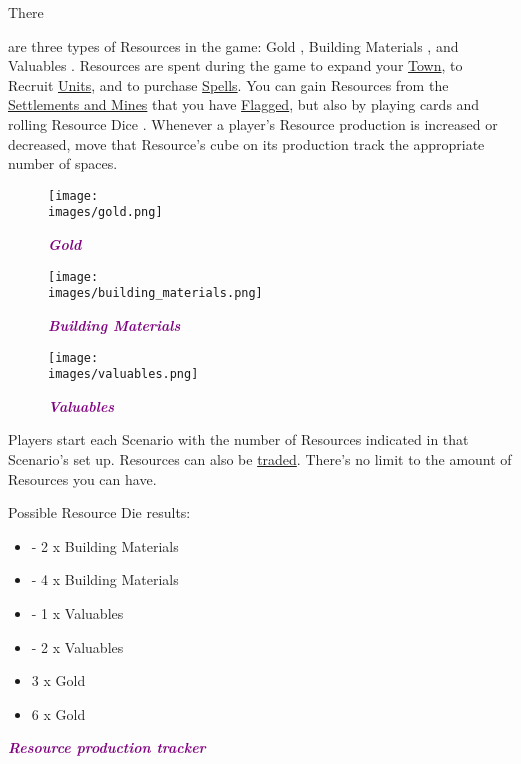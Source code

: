 \hypertarget{Resources}{There} are three types of Resources in the game: Gold , Building Materials , and Valuables .
Resources are spent during the game to expand your \hyperlink{Town}{Town}, to Recruit \hyperlink{Units}{Units}, and to purchase \hyperlink{spells}{Spells}.
You can gain Resources from the \hyperlink{Mines}{Settlements and Mines} that you have \hyperlink{Categories}{Flagged}, but also by playing cards and rolling Resource Dice .
Whenever a player's Resource production is increased or decreased, move that Resource's cube on its production track the appropriate number of spaces.\par
\begin{figure}[h]
  \centering
    \centering
    \texttt{[image: \\images/gold.png]}
    \caption{{\textit{\textbf{\textcolor{purple}{Gold}}}}}
  \endminipage
    \centering
    \texttt{[image: \\images/building\_materials.png]}
    \caption{{\textit{\textbf{{\textcolor{purple}{Building Materials}}}}}}
  \endminipage
    \centering
    \texttt{[image: \\images/valuables.png]}
    \caption{{\textit{\textbf{{\textcolor{purple}{Valuables}}}}}}
  \endminipage
\end{figure}
Players start each Scenario with the number of Resources indicated in that Scenario’s set up.
Resources can also be \hyperlink{Trading}{traded}.
There's no limit to the amount of Resources you can have.\bigbreak

\begin{minipage}[T]{0.38\textwidth}
    Possible Resource Die  results:\bigbreak
    \begin{itemize}
        \setlength\itemsep{10pt}
        \item  - 2 x Building Materials
        \item  - 4 x Building Materials
        \item  - 1 x Valuables
        \item  - 2 x Valuables
        \item  3 x Gold
        \item  6 x Gold
    \end{itemize}
\end{minipage}
\begin{minipage}[t]{0.48\textwidth}
    \break
    \centering
    \footnotesize{\textbf{\textit{\textcolor{purple}{Resource production tracker}}}}
\end{minipage}\hfill
